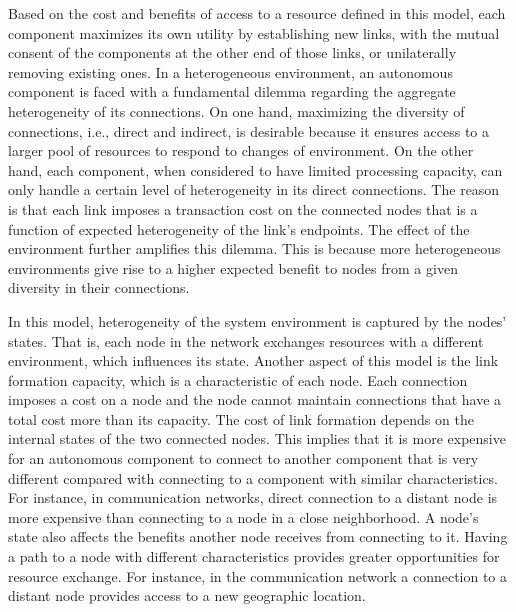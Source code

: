 \documentclass[journal,onecolumn]{IEEEtran}
\theoremstyle{plain}
\begin{document}
Based on the cost and benefits of access to a resource defined in this model, each component maximizes its own utility by establishing new links, with the mutual consent of the components at the other end of those links, or unilaterally removing existing ones. In a heterogeneous environment, an autonomous component is faced with a fundamental dilemma regarding the aggregate heterogeneity of its connections. On one hand, maximizing the diversity of connections, i.e., direct and indirect, is desirable because it ensures access to a larger pool of resources to respond to changes of environment. On the other hand, each component, when considered to have limited processing capacity, can only handle a certain level of heterogeneity in its direct connections. The reason is that each link imposes a transaction cost on the connected nodes that is a function of expected heterogeneity of the link's endpoints. The effect of the environment further amplifies this dilemma. This is because more heterogeneous environments give rise to a higher expected benefit to nodes from a given diversity in their connections. 

In this model, heterogeneity of the system environment is captured by the nodes' states. That is, each node in the network exchanges resources with a different environment, which influences its state. Another aspect of this model is the link formation capacity, which is a characteristic of each node. Each connection imposes a cost on a node and the node cannot maintain connections that have a total cost more than its capacity. The cost of link formation depends on the internal states of the two connected nodes. This implies that it is more expensive for an autonomous component to connect to another component that is very different compared with connecting to a component with similar characteristics. For instance, in communication networks, direct connection to a distant node is more expensive than connecting to a node in a close neighborhood. A node's state also affects the benefits another node receives from connecting to it. Having a path to a node with different characteristics provides greater opportunities for resource exchange. For instance, in the communication network a connection to a distant node provides access to a new geographic location.  
\end{document}
